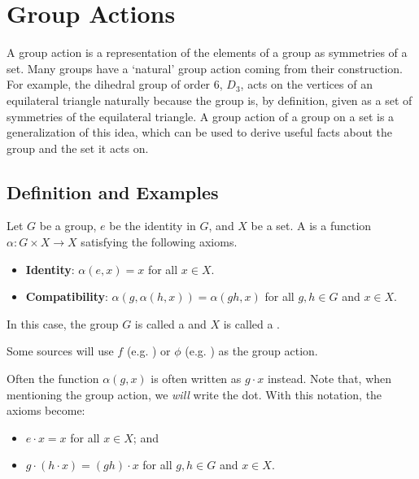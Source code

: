 \chapter{Group Actions}
A group action is a representation of the elements of a group as symmetries of a set. Many groups have a `natural' group action coming from their construction. For example, the dihedral group of order 6, $D_3$, acts on the vertices of an equilateral triangle naturally because the group is, by definition, given as a set of symmetries of the equilateral triangle. A group action of a group on a set is a generalization of this idea, which can be used to derive useful facts about the group and the set it acts on.

\section{Definition and Examples}
\begin{definition}\label{definition-group-action}
    Let $G$ be a group, $e$ be the identity in $G$, and $X$ be a set. A  is a function $\alpha: G \times X \to X$ satisfying the following axioms.
    \begin{itemize}
        \item \textbf{Identity}: $\alpha(e, x) = x$ for all $x \in X$.
        \item \textbf{Compatibility}: $\alpha(g, \alpha(h, x)) = \alpha(gh, x)$ for all $g, h \in G$ and $x \in X$.
    \end{itemize}
    In this case, the group $G$ is called a  and $X$ is called a .
\end{definition}
\begin{remark}
    Some sources will use $f$ (e.g. \cite{brilliant_group-actions}) or $\phi$ (e.g. \cite{rowland_group-action}) as the group action.
\end{remark}

Often the function $\alpha(g, x)$ is often written as $g \cdot x$ instead. Note that, when mentioning the group action, we \textit{will} write the dot. With this notation, the axioms become:
\begin{itemize}
    \item $e \cdot x = x$ for all $x \in X$; and
    \item $g \cdot (h \cdot x) = (gh) \cdot x$ for all $g, h \in G$ and $x \in X$.
\end{itemize}

